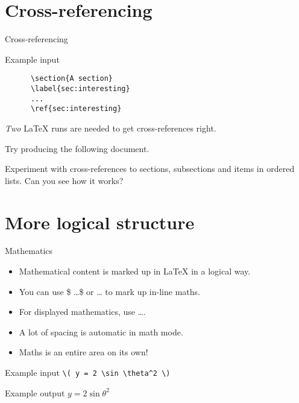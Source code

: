 \section{Cross-referencing}

\begin{frame}[fragile]{Cross-referencing}

  \begin{block}{Example input}
	\begin{verbatim}
	  \section{A section}
	  \label{sec:interesting}
	  ...
	  \ref{sec:interesting}
	\end{verbatim}
  \end{block}

  \emph{Two} \LaTeX{} runs are needed to get cross-references right.

\end{frame}


\begin{exercise}
  Try producing the following document.
  

  Experiment with cross-references to sections, subsections and items in ordered lists.
  Can you see how it works?
\end{exercise}


\section{More logical structure}

\begin{frame}[fragile]{Mathematics}

  \begin{itemize}
	\item Mathematical content is marked up in \LaTeX{} in a logical way.
	\item You can use \$ \ldots \$ or \cs{(} \ldots \cs{)} to mark up in-line maths.
	\item For displayed mathematics, use \cs{[} \ldots \cs{]}.
	\item A lot of spacing is automatic in math mode.
	\item Maths is an entire area on its own!
  \end{itemize}

  \begin{block}{Example input}
	\verb"\( y = 2 \sin \theta^2 \)"
  \end{block}

  \begin{block}{Example output}
	\( y = 2 \sin \theta^2 \)
  \end{block}

\end{frame}

